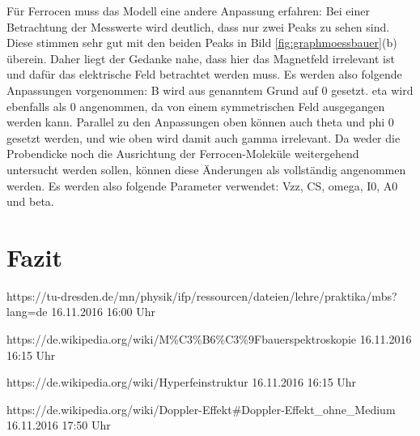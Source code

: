 \documentclass[german, %
parskip=full, %
bibliography=totoc, %
]{scrartcl}
\begin{document}
Für Ferrocen muss das Modell eine andere Anpassung erfahren: Bei einer Betrachtung der Messwerte wird deutlich, dass nur zwei Peaks zu sehen sind. Diese stimmen sehr gut mit den beiden Peaks in Bild \ref{fig:graphmoessbauer}(b) überein. Daher liegt der Gedanke nahe, dass hier das Magnetfeld irrelevant ist und dafür das elektrische Feld betrachtet werden muss. Es werden also folgende Anpassungen vorgenommen: B wird aus genanntem Grund auf 0 gesetzt. eta wird ebenfalls als 0 angenommen, da von einem symmetrischen Feld ausgegangen werden kann. Parallel zu den Anpassungen oben können auch theta und phi 0 gesetzt werden, und wie oben wird damit auch gamma irrelevant. Da weder die Probendicke noch die Ausrichtung der Ferrocen-Moleküle weitergehend untersucht werden sollen, können diese Änderungen als vollständig angenommen werden. Es werden also folgende Parameter verwendet: Vzz, CS, omega, I0, A0 und beta.

\section{Fazit}




\begin{thebibliography}{9}

  https://tu-dresden.de/mn/physik/ifp/ressourcen/dateien/lehre/praktika/mbs?lang=de
	16.11.2016
	16:00 Uhr
	
  https://de.wikipedia.org/wiki/M\%C3\%B6\%C3\%9Fbauerspektroskopie
	16.11.2016
	16:15 Uhr
	
  https://de.wikipedia.org/wiki/Hyperfeinstruktur
	16.11.2016
	16:15 Uhr
	
  https://de.wikipedia.org/wiki/Doppler-Effekt\#Doppler-Effekt\_ohne\_Medium
	16.11.2016
	17:50 Uhr

\end{thebibliography}
\end{document}
